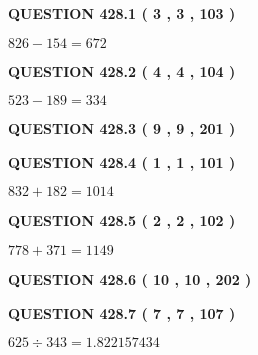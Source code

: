 \documentclass{ctexart}
\begin{document}
   
  
\vspace{0.2in}
  
{\textbf{\Large{QUESTION
428.1 
 ( 3 , 3 , 103 )
}}}
  
  
 
 

$ %
826 -  %
154=   %
672$
 
 
  
\vspace{0.2in}
  
{\textbf{\Large{QUESTION
428.2 
 ( 4 , 4 , 104 )
}}}
  
  
 
 

$ %
523 -  %
189=   %
334$
 
 
  
\vspace{0.2in}
  
{\textbf{\Large{QUESTION
428.3 
 ( 9 , 9 , 201 )
}}}
  
  
  
\vspace{0.2in}
  
{\textbf{\Large{QUESTION
428.4 
 ( 1 , 1 , 101 )
}}}
  
  
 
 

$ %
832 +  %
182=   %
1014$
 
 
  
\vspace{0.2in}
  
{\textbf{\Large{QUESTION
428.5 
 ( 2 , 2 , 102 )
}}}
  
  
 
 

$ %
778 +  %
371=   %
1149$
 
 
  
\vspace{0.2in}
  
{\textbf{\Large{QUESTION
428.6 
 ( 10 , 10 , 202 )
}}}
  
  
  
\vspace{0.2in}
  
{\textbf{\Large{QUESTION
428.7 
 ( 7 , 7 , 107 )
}}}
  
  
 
 

$ %
625 \div  %
343=   %
1.822157434$
 
 
  
\vspace{0.2in}
  
\end{document}
